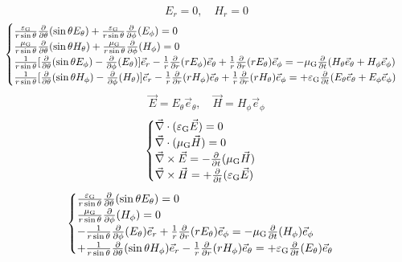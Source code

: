 \begin{equation}
    {E}_r=0,\quad{H}_r=0
\end{equation}
\begin{equation}
    \begin{cases}
        \frac{\varepsilon_{\text{G}}}{r\sin\theta}\frac{\partial}{\partial\theta}(\sin\theta{E}_\theta)+\frac{\varepsilon_{\text{G}}}{r\sin\theta}\frac{\partial}{\partial\phi}({E}_\phi)=0\\
        \frac{\mu_{\text{G}}}{r\sin\theta}\frac{\partial}{\partial\theta}(\sin\theta{H}_\theta)+\frac{\mu_{\text{G}}}{r\sin\theta}\frac{\partial}{\partial\phi}({H}_\phi)=0\\
        \frac{1}{r\sin\theta}[\frac{\partial}{\partial\theta}(\sin\theta{E}_\phi)-\frac{\partial}{\partial\phi}({E}_\theta)]\vec{e}_r-\frac{1}{r}\frac{\partial}{\partial r}(r{E}_\phi)\vec{e}_\theta+\frac{1}{r}\frac{\partial}{\partial r}(r{E}_\theta)\vec{e}_\phi=-\mu_{\text{G}}\frac{\partial}{\partial t}({H}_\theta\vec{e}_\theta+{H}_\phi\vec{e}_\phi)\\
        \frac{1}{r\sin\theta}[\frac{\partial}{\partial\theta}(\sin\theta{H}_\phi)-\frac{\partial}{\partial\phi}({H}_\theta)]\vec{e}_r-\frac{1}{r}\frac{\partial}{\partial r}(r{H}_\phi)\vec{e}_\theta+\frac{1}{r}\frac{\partial}{\partial r}(r{H}_\theta)\vec{e}_\phi=+\varepsilon_{\text{G}}\frac{\partial}{\partial t}({E}_\theta\vec{e}_\theta+{E}_\phi\vec{e}_\phi)
    \end{cases}
\end{equation}
\begin{equation}
    \vec{E}={E}_\theta\vec{e}_\theta,\quad\vec{H}={H}_\phi\vec{e}_\phi
\end{equation}
\begin{equation}
    \begin{cases}
        \vec{\nabla}\cdot(\varepsilon_{\text{G}}\vec{E})=0\\
        \vec{\nabla}\cdot(\mu_{\text{G}}\vec{H})=0\\
        \vec{\nabla}\times\vec{E}=-\frac{\partial}{\partial t}(\mu_{\text{G}}\vec{H})\\
        \vec{\nabla}\times\vec{H}=+\frac{\partial}{\partial t}(\varepsilon_{\text{G}}\vec{E})
    \end{cases}
\end{equation}
\begin{equation}
    \begin{cases}
        \frac{\varepsilon_{\text{G}}}{r\sin\theta}\frac{\partial}{\partial\theta}(\sin\theta E_\theta)=0\\
        \frac{\mu_{\text{G}}}{r\sin\theta}\frac{\partial}{\partial\phi}({H}_\phi)=0\\
        -\frac{1}{r\sin\theta}\frac{\partial}{\partial\phi}({E}_\theta)\vec{e}_r+\frac{1}{r}\frac{\partial}{\partial r}(r{E}_\theta)\vec{e}_\phi=-\mu_{\text{G}}\frac{\partial}{\partial t}({H}_\phi)\vec{e}_\phi\\
        +\frac{1}{r\sin\theta}\frac{\partial}{\partial\theta}(\sin\theta{H}_\phi)\vec{e}_r-\frac{1}{r}\frac{\partial}{\partial r}(r{H}_\phi)\vec{e}_\theta=+\varepsilon_{\text{G}}\frac{\partial}{\partial t}({E}_\theta)\vec{e}_\theta\\
    \end{cases}
\end{equation}
